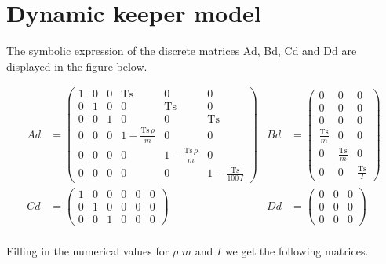 \documentclass[•]{article}
\begin{document}
\section{Dynamic keeper model}
The symbolic expression of the discrete matrices Ad, Bd, Cd and Dd are displayed in the figure below. 

\begin{align*}
Ad &= \left(\begin{array}{cccccc} 1 & 0 & 0 & \mathrm{Ts} & 0 & 0\\ 0 & 1 & 0 & 0 & \mathrm{Ts} & 0\\ 0 & 0 & 1 & 0 & 0 & \mathrm{Ts}\\ 0 & 0 & 0 & 1 - \frac{\mathrm{Ts}\, \rho}{m} & 0 & 0\\ 0 & 0 & 0 & 0 & 1 - \frac{\mathrm{Ts}\, \rho}{m} & 0\\ 0 & 0 & 0 & 0 & 0 & 1 - \frac{\mathrm{Ts}}{100\, I} \end{array}\right) & Bd&= \left(\begin{array}{ccc} 0 & 0 & 0\\ 0 & 0 & 0\\ 0 & 0 & 0\\ \frac{\mathrm{Ts}}{m} & 0 & 0\\ 0 & \frac{\mathrm{Ts}}{m} & 0\\ 0 & 0 & \frac{\mathrm{Ts}}{I} \end{array}\right) \\
Cd &=  \left(\begin{array}{cccccc} 1 & 0 & 0 & 0 & 0 & 0\\ 0 & 1 & 0 & 0 & 0 & 0\\ 0 & 0 & 1 & 0 & 0 & 0 \end{array}\right)  &  Dd &=  \left(\begin{array}{ccc} 0 & 0 & 0\\ 0 & 0 & 0\\ 0 & 0 & 0 \end{array}\right) \\ 
\end{align*}

Filling in the numerical values for $\rho$ $m$ and $I$ we get the following matrices.
\end{document}
